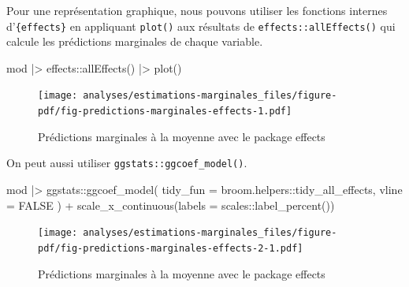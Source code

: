 \documentclass[
  letterpaper,
  DIV=11,
  numbers=noendperiod,
  oneside]{scrreprt}
\newenvironment{Shaded}{\begin{snugshade}}{\end{snugshade}}
\newcommand{\AttributeTok}[1]{\textcolor[rgb]{0.40,0.45,0.13}{#1}}
\newcommand{\ConstantTok}[1]{\textcolor[rgb]{0.56,0.35,0.01}{#1}}
\newcommand{\FunctionTok}[1]{\textcolor[rgb]{0.28,0.35,0.67}{#1}}
\newcommand{\NormalTok}[1]{\textcolor[rgb]{0.00,0.23,0.31}{#1}}
\newcommand{\SpecialCharTok}[1]{\textcolor[rgb]{0.37,0.37,0.37}{#1}}
\begin{document}
Pour une représentation graphique, nous pouvons utiliser les fonctions
internes d'\texttt{\{effects\}} en appliquant \texttt{plot()} aux
résultats de \texttt{effects::allEffects()} qui calcule les prédictions
marginales de chaque variable.

\begin{Shaded}
\begin{Highlighting}[]
\NormalTok{mod }\SpecialCharTok{|\textgreater{}} 
\NormalTok{  effects}\SpecialCharTok{::}\FunctionTok{allEffects}\NormalTok{() }\SpecialCharTok{|\textgreater{}} 
  \FunctionTok{plot}\NormalTok{()}
\end{Highlighting}
\end{Shaded}

\begin{figure}[H]

{\centering \texttt{[image: analyses/estimations-marginales\_files/figure-pdf/fig-predictions-marginales-effects-1.pdf]}

}

\caption{\label{fig-predictions-marginales-effects}Prédictions
marginales à la moyenne avec le package effects}

\end{figure}

On peut aussi utiliser \texttt{ggstats::ggcoef\_model()}.

\begin{Shaded}
\begin{Highlighting}[]
\NormalTok{mod }\SpecialCharTok{|\textgreater{}} 
\NormalTok{  ggstats}\SpecialCharTok{::}\FunctionTok{ggcoef\_model}\NormalTok{(}
    \AttributeTok{tidy\_fun =}\NormalTok{ broom.helpers}\SpecialCharTok{::}\NormalTok{tidy\_all\_effects,}
    \AttributeTok{vline =} \ConstantTok{FALSE}
\NormalTok{  ) }\SpecialCharTok{+}
  \FunctionTok{scale\_x\_continuous}\NormalTok{(}\AttributeTok{labels =}\NormalTok{ scales}\SpecialCharTok{::}\FunctionTok{label\_percent}\NormalTok{())}
\end{Highlighting}
\end{Shaded}

\begin{figure}[H]

{\centering \texttt{[image: analyses/estimations-marginales\_files/figure-pdf/fig-predictions-marginales-effects-2-1.pdf]}

}

\caption{\label{fig-predictions-marginales-effects-2}Prédictions
marginales à la moyenne avec le package effects}

\end{figure}
\end{document}

